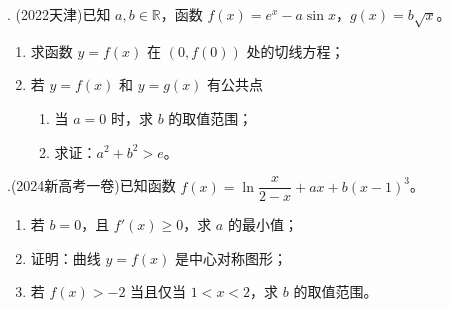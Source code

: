 \documentclass{article}
\begin{document}
. (2022天津)已知 \(a,b \in \mathbb{R}\)，函数 \(f(x) = e^x - a\sin x\)，\(g(x) = b\sqrt{x}\)。

\begin{enumerate}
    \item[(I)] 求函数 \(y = f(x)\) 在 \((0, f(0))\) 处的切线方程；
    \item[(II)] 若 \(y = f(x)\) 和 \(y = g(x)\) 有公共点
    \begin{enumerate}
        \item[(i)] 当 \(a = 0\) 时，求 \(b\) 的取值范围；
        \item[(ii)] 求证：\(a^2 + b^2 > e\)。
    \end{enumerate}
\end{enumerate}
\vspace{25\baselineskip}



.(2024新高考一卷)已知函数 \(f(x) = \ln \dfrac{x}{2 - x} + ax + b(x - 1)^3\)。
\begin{enumerate}
    \item[(1)] 若 \(b = 0\)，且 \(f'(x) \ge 0\)，求 \(a\) 的最小值；
    \item[(2)] 证明：曲线 \(y = f(x)\) 是中心对称图形；
    \item[(3)] 若 \(f(x) > -2\) 当且仅当 \(1 < x < 2\)，求 \(b\) 的取值范围。
\end{enumerate}
\end{document}
